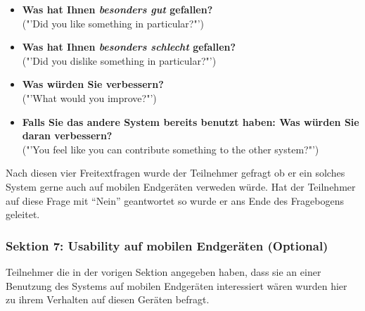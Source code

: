 \documentclass[11pt,a4paper,twoside,ngerman]{article}
\begin{document}
\begin{itemize}
    \item \textbf{Was hat Ihnen \emph{besonders gut} gefallen?} \\ ("'Did you like something in particular?"')
    \item \textbf{Was hat Ihnen \emph{besonders schlecht} gefallen?} \\ ("'Did you dislike something in particular?"')
    \item \textbf{Was würden Sie verbessern?} \\ ("'What would you improve?"')
    \item \textbf{Falls Sie das andere System bereits benutzt haben: Was würden Sie daran verbessern?} \\ ("'You feel like you can contribute something to the other system?"')
\end{itemize}

\noindent
Nach diesen vier Freitextfragen wurde der Teilnehmer gefragt ob er ein solches System gerne auch auf mobilen Endgeräten verweden würde. Hat der Teilnehmer auf diese Frage mit "`Nein"' geantwortet so wurde er ans Ende des Fragebogens geleitet.

\subsubsection{Sektion 7: Usability auf mobilen Endgeräten (Optional)}
Teilnehmer die in der vorigen Sektion angegeben haben, dass sie an einer Benutzung des Systems auf mobilen Endgeräten interessiert wären wurden hier zu ihrem Verhalten auf diesen Geräten befragt.
\end{document}
